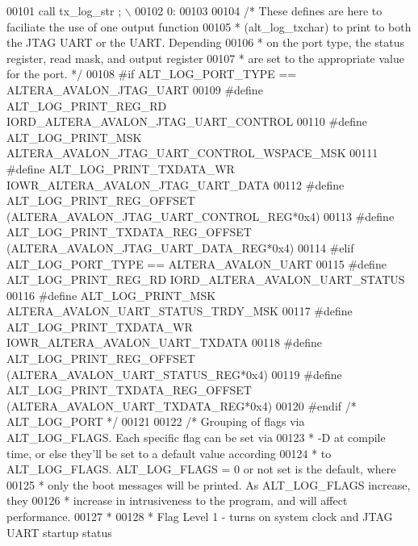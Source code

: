 \begin{DoxyCode}
{{{{00101 \textcolor{preprocessor}{     call tx\_log\_str ; \(\backslash\)}
00102 \textcolor{preprocessor}{       0:}
00103     
00104     \textcolor{comment}{/* These defines are here to faciliate the use of one output function }
00105 \textcolor{comment}{     * (alt\_log\_txchar) to print to both the JTAG UART or the UART. Depending}
00106 \textcolor{comment}{     * on the port type, the status register, read mask, and output register }
00107 \textcolor{comment}{     * are set to the appropriate value for the port.  */}
00108 \textcolor{preprocessor}{    #if ALT\_LOG\_PORT\_TYPE == ALTERA\_AVALON\_JTAG\_UART }
00109 \textcolor{preprocessor}{      #define ALT\_LOG\_PRINT\_REG\_RD IORD\_ALTERA\_AVALON\_JTAG\_UART\_CONTROL}
00110 \textcolor{preprocessor}{      #define ALT\_LOG\_PRINT\_MSK ALTERA\_AVALON\_JTAG\_UART\_CONTROL\_WSPACE\_MSK}
00111 \textcolor{preprocessor}{      #define ALT\_LOG\_PRINT\_TXDATA\_WR IOWR\_ALTERA\_AVALON\_JTAG\_UART\_DATA}
00112 \textcolor{preprocessor}{      #define ALT\_LOG\_PRINT\_REG\_OFFSET (ALTERA\_AVALON\_JTAG\_UART\_CONTROL\_REG*0x4)}
00113 \textcolor{preprocessor}{      #define ALT\_LOG\_PRINT\_TXDATA\_REG\_OFFSET (ALTERA\_AVALON\_JTAG\_UART\_DATA\_REG*0x4)}
00114 \textcolor{preprocessor}{    #elif ALT\_LOG\_PORT\_TYPE == ALTERA\_AVALON\_UART }
00115 \textcolor{preprocessor}{      #define ALT\_LOG\_PRINT\_REG\_RD IORD\_ALTERA\_AVALON\_UART\_STATUS}
00116 \textcolor{preprocessor}{      #define ALT\_LOG\_PRINT\_MSK ALTERA\_AVALON\_UART\_STATUS\_TRDY\_MSK}
00117 \textcolor{preprocessor}{      #define ALT\_LOG\_PRINT\_TXDATA\_WR IOWR\_ALTERA\_AVALON\_UART\_TXDATA}
00118 \textcolor{preprocessor}{      #define ALT\_LOG\_PRINT\_REG\_OFFSET (ALTERA\_AVALON\_UART\_STATUS\_REG*0x4)}
00119 \textcolor{preprocessor}{      #define ALT\_LOG\_PRINT\_TXDATA\_REG\_OFFSET (ALTERA\_AVALON\_UART\_TXDATA\_REG*0x4)}
00120 \textcolor{preprocessor}{    #endif }\textcolor{comment}{/* ALT\_LOG\_PORT */}\textcolor{preprocessor}{}
00121 
00122     \textcolor{comment}{/* Grouping of flags via ALT\_LOG\_FLAGS.  Each specific flag can be set via }
00123 \textcolor{comment}{     * -D at compile time, or else they'll be set to a default value according}
00124 \textcolor{comment}{     * to ALT\_LOG\_FLAGS.  ALT\_LOG\_FLAGS = 0 or not set is the default, where }
00125 \textcolor{comment}{     * only the boot messages will be printed. As ALT\_LOG\_FLAGS increase, they}
00126 \textcolor{comment}{     * increase in intrusiveness to the program, and will affect performance.}
00127 \textcolor{comment}{     *}
00128 \textcolor{comment}{     * Flag Level 1 - turns on system clock and JTAG UART startup status}
}}}}
\end{DoxyCode}
